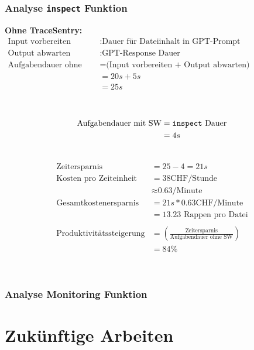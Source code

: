 \documentclass[a4paper,12pt]{report}
\begin{document}
    \subsubsection{Analyse \texttt{inspect} Funktion}
    \textbf{Ohne TraceSentry:} \\
    \begin{align*}
        \text{Input vorbereiten}&: \text{Dauer für Dateiinhalt in GPT-Prompt kopieren/hochladen}\\
        \text{Output abwarten}&: \text{GPT-Response Dauer} \\
        \text{Aufgabendauer ohne SW} &= \text{(Input vorbereiten + Output abwarten)} \\
        &= 20s + 5s \\
        &= 25s \\
    \end{align*}

     \\
    \begin{align*}
        \text{Aufgabendauer mit SW} &= \text{\texttt{inspect} Dauer} \\
        &= 4s
    \end{align*}

     \\
    \begin{align*}
        \text{Zeitersparnis} &= 25 - 4 = 21s \\
        \text{Kosten pro Zeiteinheit} &= 38 \text{CHF/Stunde} \\ &\approx \text{0.63/Minute} \\
        \text{Gesamtkostenersparnis} &= 21s * 0.63 \text{CHF/Minute} \\ &= 13.23 \text{ Rappen pro Datei} \\ \\
        \text{Produktivitätssteigerung} &= \left( \frac{\text{Zeitersparnis}}{\text{Aufgabendauer ohne SW}} \right) \\ &= 84\%
    \end{align*}

    \\
    \subsubsection{Analyse Monitoring Funktion}

    \clearpage


    \section{Zukünftige Arbeiten}\label{sec:zukunftigearbeiten}
\end{document}
